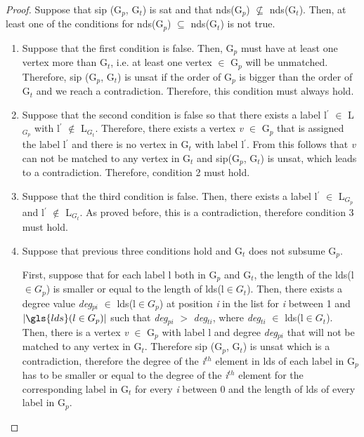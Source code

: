 \documentclass{l4proj}
\begin{document}
\begin{proof}
Suppose that \gls{sip} (G$_{p}$, G$_{t}$) is \gls{sat} and that \gls{nds}(G$_{p}$) $\nsubseteq$ \gls{nds}(G$_{t}$). Then, at least one of the conditions for \gls{nds}(G$_{p}$) $\subseteq$ \gls{nds}(G$_{t}$) is not true.
\begin{enumerate}
\item Suppose that the first condition is false. Then, G$_{p}$ must have at least one vertex more than G$_{t}$, i.e. at least one vertex $\in$ G$_{p}$ will be unmatched. Therefore, \gls{sip} (G$_{p}$, G$_{t}$) is \gls{unsat} if the order of G$_{p}$ is bigger than the order of G$_{t}$ and we reach a contradiction. Therefore, this condition must always hold.
\item Suppose that the second condition is false so that there exists a label l$^{\prime}$ $\in$ L$_{G_{p}}$ with l$^{\prime}$ $\notin$ L$_{G_{t}}$. Therefore, there exists a vertex \textit{v} $\in$ G$_{p}$ that is assigned the label l$^{\prime}$ and there is no vertex in G$_{t}$ with label l$^{\prime}$. From this follows that \textit{v} can not be matched to any vertex in G$_{t}$ and \gls{sip}(G$_{p}$, G$_{t}$) is \gls{unsat}, which leads to a contradiction. Therefore, condition 2 must hold.
\item Suppose that the third condition is false. Then, there exists a label l$^{\prime}$ $\in$ L$_{G_{p}}$ and l$^{\prime}$ $\notin$ L$_{G_{t}}$. As proved before, this is a contradiction, therefore condition 3 must hold.
\item Suppose that previous three conditions hold and G$_{t}$ does not subsume G$_{p}$.

First, suppose that for each label l both in G$_{p}$ and G$_{t}$, the length of the \gls{lds}(l$\in G_{p}$) is smaller or equal to the length of \gls{lds}(l$\in G_{t}$). Then, there exists a degree value \textit{deg$_{pi}$} $\in$ \gls{lds}(l$\in G_{p}$) at position \textit{i} in the list for \textit{i} between 1 and $| \gls{lds}(l\in G_{p})|$ such that \textit{deg$_{pi}$} $>$ \textit{deg$_{ti}$}, where \textit{deg$_{ti}$} $\in$ \gls{lds}(l$\in G_{t}$). Then, there is a vertex \textit{v} $\in$ G$_{p}$ with label l and degree \textit{deg$_{pi}$} that will not be matched to any vertex in G$_{t}$. Therefore \gls{sip} (G$_{p}$, G$_{t}$) is \gls{unsat} which is a contradiction, therefore the degree of the \textit{i$^{th}$} element in \gls{lds} of each label in G$_{p}$ has to be smaller or equal to the degree of the \textit{i$^{th}$} element for the corresponding label in G$_{t}$ for every \textit{i} between 0 and the length of \gls{lds} of every label in G$_{p}$.


\end{enumerate}
\end{proof}
\end{document}
